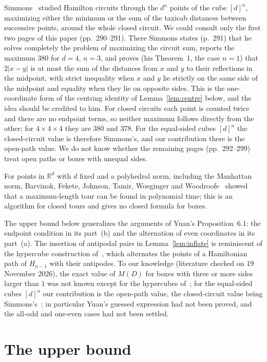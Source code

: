 \documentclass[11pt]{article}
\theoremstyle{remark}
\begin{document}
Simmons~\cite{simmons} studied Hamilton circuits through the $d^n$ points of
the cube $[d]^n$, maximizing either the minimum or the sum of the taxicab
distances between successive points, around the whole closed circuit. We could
consult only the first two pages of this paper (pp.~290--291). There Simmons
states (p.~291) that he solves completely the problem of maximizing the
circuit sum, reports the maximum $380$ for $d=4$, $n=3$, and proves (his Theorem~1, the case $n=1$)
that $2|x-y|$ is at most the sum of the distances from $x$ and $y$ to their
reflections in the midpoint, with strict inequality when $x$ and $y$ lie
strictly on the same side of the midpoint and equality when they lie on
opposite sides. This is the one-coordinate form of the centring identity of
Lemma~\ref{lem:centre} below, and the idea should be credited to him. For
closed circuits each point is counted twice and there are no endpoint terms,
so neither maximum follows directly from the other; for $4\times4\times4$ they
are $380$ and $378$. For the equal-sided cubes $[d]^n$ the closed-circuit
value is therefore Simmons's, and our contribution there is the open-path
value. We do not know whether
the remaining pages (pp.~292--299) treat open paths or boxes with unequal
sides.

For points in $\mathbb R^d$ with $d$ fixed and a polyhedral norm, including
the Manhattan norm, Barvinok, Fekete, Johnson, Tamir, Woeginger and
Woodroofe~\cite{bfjtww} showed that a maximum-length tour can be found in
polynomial time; this is an algorithm for closed tours and gives no closed
formula for boxes.

The upper bound below generalizes the arguments of Yuan's Proposition~6.1: the
endpoint condition in its part~(b) and the alternation of even coordinates in
its part~(a). The insertion of antipodal pairs in Lemma~\ref{lem:inflate} is
reminiscent of the hypercube construction of~\cite{kkt}, which alternates the
points of a Hamiltonian path of $H_{n-1}$ with their antipodes. To our
knowledge (literature checked on 19 November 2026), the exact value of $M(D)$ for boxes
with three or more sides larger than $1$ was not known except for the
hypercubes of~\cite{kkt}; for the equal-sided cubes $[d]^n$ our contribution
is the open-path value, the closed-circuit value being Simmons's~\cite{simmons};
in particular Yuan's guessed expression had not been
proved, and the all-odd and one-even cases had not been settled.

\section{The upper bound}\label{sec:upper}
\end{document}
